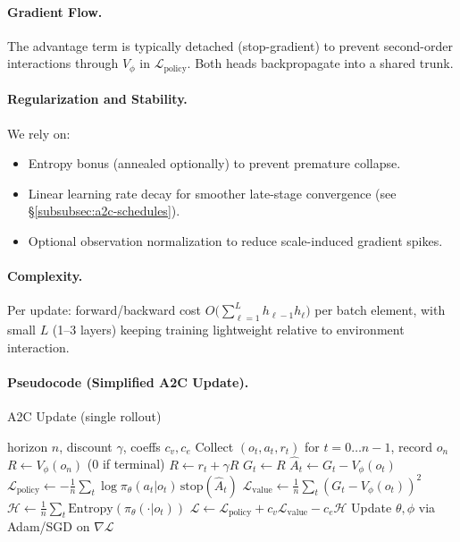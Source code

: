 \paragraph{Gradient Flow.}
The advantage term is typically detached (stop-gradient) to prevent second-order interactions through $V_{\phi}$ in $\mathcal{L}_{\text{policy}}$. Both heads backpropagate into a shared trunk.

\paragraph{Regularization and Stability.}
We rely on:
\begin{itemize}
  \item Entropy bonus (annealed optionally) to prevent premature collapse.
  \item Linear learning rate decay for smoother late-stage convergence (see \S\ref{subsubsec:a2c-schedules}).
  \item Optional observation normalization to reduce scale-induced gradient spikes.
\end{itemize}

\paragraph{Complexity.}
Per update: forward/backward cost $O\!\Big(\sum_{\ell=1}^{L} h_{\ell-1} h_{\ell}\Big)$ per batch element, with small $L$ (1--3 layers) keeping training lightweight relative to environment interaction.

\paragraph{Pseudocode (Simplified A2C Update).}
\begin{algorithm}[H]
\caption{A2C Update (single rollout)}
\label{alg:a2c-update}
\begin{algorithmic}[1]
\Require horizon $n$, discount $\gamma$, coeffs $c_v, c_e$
\State Collect $(o_t,a_t,r_t)$ for $t=0\dots n-1$, record $o_n$
\State $R \gets V_{\phi}(o_n)$  (0 if terminal)
   \State $R \gets r_t + \gamma R$
   \State $G_t \gets R$
\EndFor
\State $\hat{A}_t \gets G_t - V_{\phi}(o_t)$
\State $\mathcal{L}_{\text{policy}} \gets -\frac{1}{n}\sum_t \log \pi_{\theta}(a_t|o_t)\, \text{stop}(\hat{A}_t)$
\State $\mathcal{L}_{\text{value}} \gets \frac{1}{n}\sum_t (G_t - V_{\phi}(o_t))^2$
\State $\mathcal{H} \gets \frac{1}{n}\sum_t \text{Entropy}(\pi_{\theta}(\cdot|o_t))$
\State $\mathcal{L} \gets \mathcal{L}_{\text{policy}} + c_v \mathcal{L}_{\text{value}} - c_e \mathcal{H}$
\State Update $\theta,\phi$ via Adam/SGD on $\nabla \mathcal{L}$
\end{algorithmic}
\end{algorithm}

